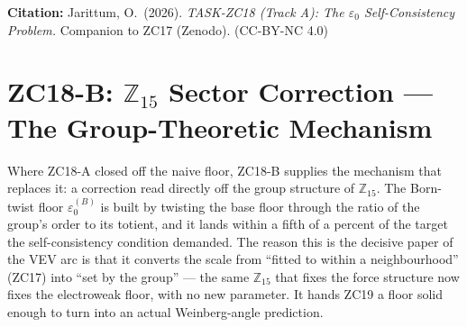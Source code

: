\documentclass[12pt, a4paper]{article}
\begin{document}
\bigskip
\begin{center}
\textbf{Citation:} Jarittum, O.\ (2026).
\textit{TASK-ZC18 (Track A): The $\varepsilon_0$ Self-Consistency Problem.}
Companion to ZC17 (Zenodo). (CC-BY-NC 4.0)
\end{center}

\bigskip


\section{ZC18-B: $\mathbb{Z}_{15}$ Sector Correction --- The Group-Theoretic Mechanism}
\label{sec:zc18b-trackb}

Where ZC18-A closed off the naive floor, ZC18-B supplies the mechanism that
replaces it: a correction read directly off the group structure of
$\mathbb{Z}_{15}$. The Born-twist floor $\varepsilon_0^{(B)}$ is built by
twisting the base floor through the ratio of the group's order to its totient,
and it lands within a fifth of a percent of the target the self-consistency
condition demanded. The reason this is the decisive paper of the VEV arc is that
it converts the scale from ``fitted to within a neighbourhood'' (ZC17) into
``set by the group'' --- the same $\mathbb{Z}_{15}$ that fixes the force
structure now fixes the electroweak floor, with no new parameter. It hands ZC19
a floor solid enough to turn into an actual Weinberg-angle prediction.

\end{document}
